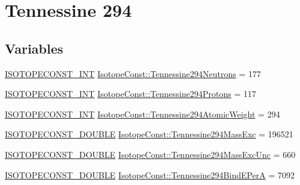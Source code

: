 \hypertarget{group___isotope_const-_tennessine-_ts294}{}\section{Tennessine 294}
\label{group___isotope_const-_tennessine-_ts294}
\subsection*{Variables}
\begin{DoxyCompactItemize}
\item 
\mbox{\hyperlink{group___isotope_const-_macros_ga5f18360b3e99483a35c32d789e62621c}{I\+S\+O\+T\+O\+P\+E\+C\+O\+N\+S\+T\+\_\+\+I\+NT}} \mbox{\hyperlink{group___isotope_const-_tennessine-_ts294_ga113438e0d1b11cec4b9de848f95a7096}{Isotope\+Const\+::\+Tennessine294\+Neutrons}} = 177
\item 
\mbox{\hyperlink{group___isotope_const-_macros_ga5f18360b3e99483a35c32d789e62621c}{I\+S\+O\+T\+O\+P\+E\+C\+O\+N\+S\+T\+\_\+\+I\+NT}} \mbox{\hyperlink{group___isotope_const-_tennessine-_ts294_gaef999f48a4fbbfd776f5c1e5f87cecf2}{Isotope\+Const\+::\+Tennessine294\+Protons}} = 117
\item 
\mbox{\hyperlink{group___isotope_const-_macros_ga5f18360b3e99483a35c32d789e62621c}{I\+S\+O\+T\+O\+P\+E\+C\+O\+N\+S\+T\+\_\+\+I\+NT}} \mbox{\hyperlink{group___isotope_const-_tennessine-_ts294_ga11f9832a76623ebcd3ab01a4a1185990}{Isotope\+Const\+::\+Tennessine294\+Atomic\+Weight}} = 294
\item 
\mbox{\hyperlink{group___isotope_const-_macros_ga8f45a7272ce02c0b4c65c44636ed719a}{I\+S\+O\+T\+O\+P\+E\+C\+O\+N\+S\+T\+\_\+\+D\+O\+U\+B\+LE}} \mbox{\hyperlink{group___isotope_const-_tennessine-_ts294_ga55c8af7d2e4ac262d7a3a12a68493d5c}{Isotope\+Const\+::\+Tennessine294\+Mass\+Exc}} = 196521
\item 
\mbox{\hyperlink{group___isotope_const-_macros_ga8f45a7272ce02c0b4c65c44636ed719a}{I\+S\+O\+T\+O\+P\+E\+C\+O\+N\+S\+T\+\_\+\+D\+O\+U\+B\+LE}} \mbox{\hyperlink{group___isotope_const-_tennessine-_ts294_ga4826fa2e0464e2e672d8a4fed24396bf}{Isotope\+Const\+::\+Tennessine294\+Mass\+Exc\+Unc}} = 660
\item 
\mbox{\hyperlink{group___isotope_const-_macros_ga8f45a7272ce02c0b4c65c44636ed719a}{I\+S\+O\+T\+O\+P\+E\+C\+O\+N\+S\+T\+\_\+\+D\+O\+U\+B\+LE}} \mbox{\hyperlink{group___isotope_const-_tennessine-_ts294_ga1995aa8e7bea688523538ef04b5084ab}{Isotope\+Const\+::\+Tennessine294\+Bind\+E\+PerA}} = 7092
\item 

\end{DoxyCompactItemize}
